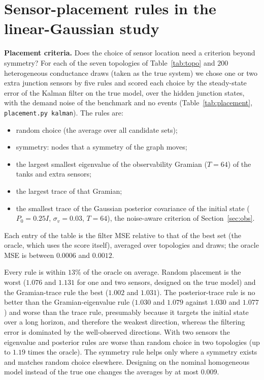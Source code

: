 \documentclass[conference]{IEEEtran}
\begin{document}
\section{Sensor-placement rules in the linear-Gaussian study}
\label{app:placement}

\textbf{Placement criteria.} Does the choice of sensor location need a criterion beyond symmetry? For each of the seven topologies of Table~\ref{tab:topo} and $200$ heterogeneous conductance draws (taken as the true system) we chose one or two extra junction sensors by five rules and scored each choice by the steady-state error of the Kalman filter on the true model, over the hidden junction states, with the demand noise of the benchmark and no events (Table~\ref{tab:placement}, \texttt{placement.py kalman}). The rules are:
\begin{itemize}
\item random choice (the average over all candidate sets);
\item symmetry: nodes that a symmetry of the graph moves;
\item the largest smallest eigenvalue of the observability Gramian ($T=64$) of the tanks and extra sensors;
\item the largest trace of that Gramian;
\item the smallest trace of the Gaussian posterior covariance of the initial state ($P_0=0.25I$, $\sigma_v=0.03$, $T=64$), the noise-aware criterion of Section~\ref{sec:obs}.
\end{itemize}
Each entry of the table is the filter MSE relative to that of the best set (the oracle, which uses the score itself), averaged over topologies and draws; the oracle MSE is between $0.0006$ and $0.0012$.

Every rule is within $13\%$ of the oracle on average. Random placement is the worst ($1.076$ and $1.131$ for one and two sensors, designed on the true model) and the Gramian-trace rule the best ($1.002$ and $1.031$). The posterior-trace rule is no better than the Gramian-eigenvalue rule ($1.030$ and $1.079$ against $1.030$ and $1.077$) and worse than the trace rule, presumably because it targets the initial state over a long horizon, and therefore the weakest direction, whereas the filtering error is dominated by the well-observed directions. With two sensors the eigenvalue and posterior rules are worse than random choice in two topologies (up to $1.19$ times the oracle). The symmetry rule helps only where a symmetry exists and matches random choice elsewhere. Designing on the nominal homogeneous model instead of the true one changes the averages by at most $0.009$.
\end{document}
